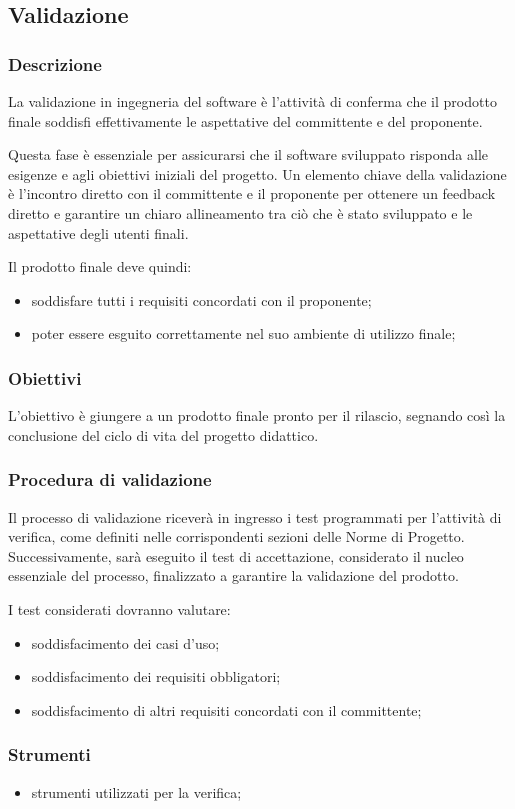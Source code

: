 \subsection{Validazione}

\subsubsection{Descrizione}
La validazione in ingegneria del software è l'attività di conferma che il prodotto finale soddisfi effettivamente le aspettative del committente e del proponente.

Questa fase è essenziale per assicurarsi che il software sviluppato risponda alle esigenze e agli obiettivi iniziali del progetto.
Un elemento chiave della validazione è l'incontro diretto con il committente e il proponente per ottenere un feedback diretto e garantire un chiaro allineamento tra ciò che è stato sviluppato e le aspettative degli utenti finali.

Il prodotto finale deve quindi:
\begin{itemize}
    \item 
        soddisfare tutti i requisiti concordati con il proponente;
    \item 
        poter essere esguito correttamente nel suo ambiente di utilizzo finale;
\end{itemize}

\subsubsection{Obiettivi}
L'obiettivo è giungere a un prodotto finale pronto per il rilascio, segnando così la conclusione del ciclo di vita del progetto didattico.

\subsubsection{Procedura di validazione}
Il processo di validazione riceverà in ingresso i test programmati per l'attività di verifica, come definiti nelle corrispondenti sezioni delle Norme di Progetto. Successivamente, sarà eseguito il test di accettazione, considerato il nucleo essenziale del processo, finalizzato a garantire la validazione del prodotto.

I test considerati dovranno valutare:
\begin{itemize}
    \item 
        soddisfacimento dei casi d’uso;
    \item 
        soddisfacimento dei requisiti obbligatori;
    \item 
        soddisfacimento di altri requisiti concordati con il committente;
\end{itemize}

\subsubsection{Strumenti}
\begin{itemize}
    \item 
        strumenti utilizzati per la verifica;
\end{itemize}

